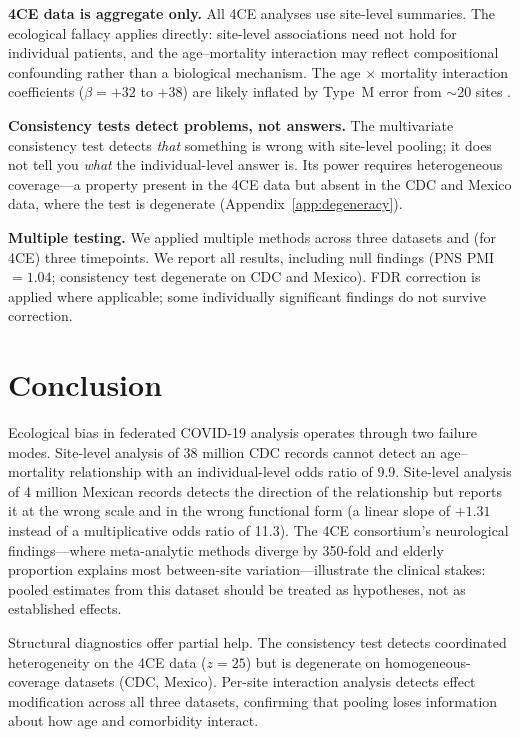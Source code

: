\documentclass{article}
\begin{document}
\textbf{4CE data is aggregate only.}  All 4CE analyses use site-level
summaries.  The ecological fallacy applies directly: site-level associations
need not hold for individual patients, and the age--mortality interaction may
reflect compositional confounding rather than a biological mechanism.  The
age $\times$ mortality interaction coefficients ($\beta = +32$ to $+38$) are
likely inflated by Type~M error from $\sim$20 sites
\cite{gelman2014typeMS}.

\textbf{Consistency tests detect problems, not answers.}  The multivariate
consistency test detects \emph{that} something is wrong with site-level
pooling; it does not tell you \emph{what} the individual-level answer is.
Its power requires heterogeneous coverage---a property present in the 4CE
data but absent in the CDC and Mexico data, where the test is degenerate
(Appendix~\ref{app:degeneracy}).

\textbf{Multiple testing.}  We applied multiple methods across three
datasets and (for 4CE) three timepoints.  We report all results, including
null findings (PNS PMI $= 1.04$; consistency test degenerate on CDC and
Mexico).  FDR correction is applied where applicable; some individually
significant findings do not survive correction.


\section{Conclusion}

Ecological bias in federated COVID-19 analysis operates through two
failure modes.  Site-level analysis of 38 million CDC records cannot detect
an age--mortality relationship with an individual-level odds ratio of 9.9.  Site-level analysis of 4 million Mexican records detects the
direction of the relationship but reports it at the wrong scale and in the
wrong functional form (a linear slope of $+1.31$ instead of a multiplicative
odds ratio of 11.3).  The 4CE consortium's neurological findings---where
meta-analytic methods diverge by 350-fold and elderly proportion explains most
between-site variation---illustrate the clinical stakes: pooled estimates from
this dataset should be treated as hypotheses, not as established effects.

Structural diagnostics offer partial help.  The consistency test detects
coordinated heterogeneity on the 4CE data ($z = 25$) but is degenerate on
homogeneous-coverage datasets (CDC, Mexico).  Per-site interaction analysis
detects effect modification across all three datasets, confirming that
pooling loses information about how age and comorbidity interact.
\end{document}
